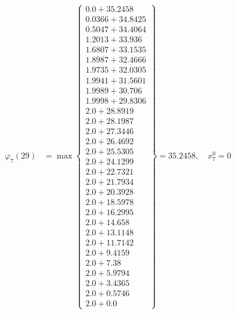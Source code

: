 \documentclass{article}
\begin{document}
\begin{align*}
  
\varphi_{7}(29) &= \max \left\{ \begin{array}{c}
0.0 + 35.2458 \\
 0.0366 + 34.8425 \\
 0.5047 + 34.4064 \\
 1.2013 + 33.936 \\
 1.6807 + 33.1535 \\
 1.8987 + 32.4666 \\
 1.9735 + 32.0305 \\
 1.9941 + 31.5601 \\
 1.9989 + 30.706 \\
 1.9998 + 29.8306 \\
 2.0 + 28.8919 \\
 2.0 + 28.1987 \\
 2.0 + 27.3446 \\
 2.0 + 26.4692 \\
 2.0 + 25.5305 \\
 2.0 + 24.1299 \\
 2.0 + 22.7321 \\
 2.0 + 21.7934 \\
 2.0 + 20.3928 \\
 2.0 + 18.5978 \\
 2.0 + 16.2995 \\
 2.0 + 14.658 \\
 2.0 + 13.1148 \\
 2.0 + 11.7142 \\
 2.0 + 9.4159 \\
 2.0 + 7.38 \\
 2.0 + 5.9794 \\
 2.0 + 3.4365 \\
 2.0 + 0.5746 \\
 2.0 + 0.0
\end{array} \right\}=35.2458,\quad x_{7}^0=0\\
  
  
  

\end{align*}
\end{document}
